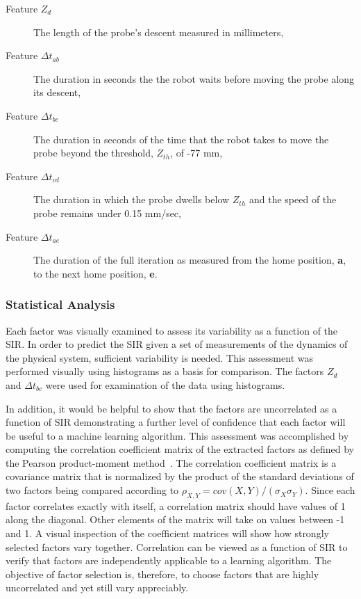 \begin{description}
    \item[Feature $Z_d$] The length of the probe's descent measured in millimeters,
    \item[Feature $\Delta{t}_{ab}$] The duration in seconds the the robot waits before moving the probe along its descent,
    \item[Feature $\Delta{t}_{bc}$] The duration in seconds of the time that the robot takes to move the probe beyond the threshold, $Z_{th}$, of -77 mm,
    \item[Feature $\Delta{t}_{cd}$] The duration in which the probe dwells below $Z_{th}$ and the speed of the probe remains under 0.15 mm/sec,
    \item[Feature $\Delta{t}_{ae}$] The duration of the full iteration as measured from the home position, \textbf{a}, to the next home position, \textbf{e}.
\end{description}


\subsubsection{Statistical Analysis}\label{ftml-conf:sec:data:stats}
Each factor was visually examined to assess its variability as a function of the SIR.  In order to predict the SIR given a set of measurements of the dynamics of the physical system, sufficient variability is needed.  This assessment was performed visually using histograms as a basis for comparison.  The factors $Z_{d}$ and $\Delta{t}_{bc}$ were used for examination of the data using histograms.  

In addition, it would be helpful to show that the factors are uncorrelated as a function of SIR demonstrating a further level of confidence that each factor will be useful to a machine learning algorithm.  This assessment was accomplished by computing the correlation coefficient matrix of the extracted factors as defined by the Pearson product-moment method~\cite{Yeager}.  The correlation coefficient matrix is a covariance matrix that is normalized by the product of the standard deviations of two factors being compared according to $\rho_{X,Y} = cov(X,Y)/(\sigma_{X}\sigma_{Y})$.	Since each factor correlates exactly with itself, a correlation matrix should have values of 1 along the diagonal.  Other elements of the matrix will take on values between -1 and 1.  A visual inspection of the coefficient matrices will show how strongly selected factors vary together.  Correlation can be viewed as a function of SIR to verify that factors are independently applicable to a learning algorithm.  The objective of factor selection is, therefore, to choose factors that are highly uncorrelated and yet still vary appreciably\cite{LeeRodgers1988}.

